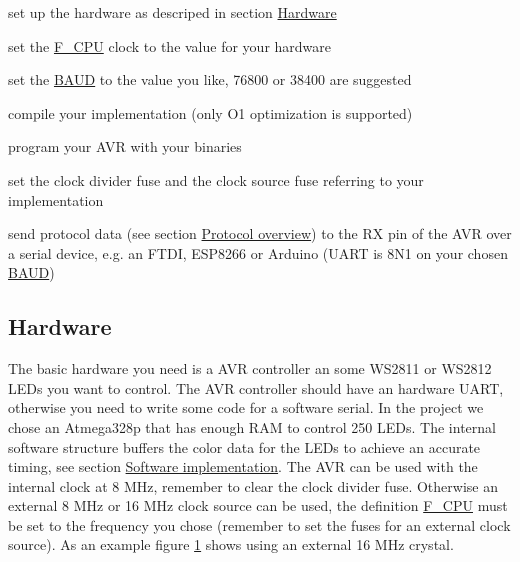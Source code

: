 \begin{DoxyItemize}
\item set up the hardware as descriped in section \hyperlink{index_hardware_sec}{Hardware} 
\item set the \hyperlink{globals_8h_a43bafb28b29491ec7f871319b5a3b2f8}{F\+\_\+\+C\+P\+U} clock to the value for your hardware 
\item set the \hyperlink{ws2811lichterkette_8c_a62634036639f88eece6fbf226b45f84b}{B\+A\+U\+D} to the value you like, 76800 or 38400 are suggested 
\item compile your implementation (only O1 optimization is supported) 
\item program your A\+V\+R with your binaries 
\item set the clock divider fuse and the clock source fuse referring to your implementation 
\item send protocol data (see section \hyperlink{index_protocol_sec}{Protocol overview}) to the R\+X pin of the A\+V\+R over a serial device, e.\+g. an F\+T\+D\+I, E\+S\+P8266 or Arduino (U\+A\+R\+T is 8\+N1 on your chosen \hyperlink{ws2811lichterkette_8c_a62634036639f88eece6fbf226b45f84b}{B\+A\+U\+D}) 
\end{DoxyItemize}\hypertarget{index_hardware_sec}{}\subsection{Hardware}\label{index_hardware_sec}
The basic hardware you need is a A\+V\+R controller an some W\+S2811 or W\+S2812 L\+E\+Ds you want to control. The A\+V\+R controller should have an hardware U\+A\+R\+T, otherwise you need to write some code for a software serial. In the project we chose an Atmega328p that has enough R\+A\+M to control 250 L\+E\+Ds. The internal software structure buffers the color data for the L\+E\+Ds to achieve an accurate timing, see section \hyperlink{index_software_sec}{Software implementation}. The A\+V\+R can be used with the internal clock at 8 M\+Hz, remember to clear the clock divider fuse. Otherwise an external 8 M\+Hz or 16 M\+Hz clock source can be used, the definition \hyperlink{globals_8h_a43bafb28b29491ec7f871319b5a3b2f8}{F\+\_\+\+C\+P\+U} must be set to the frequency you chose (remember to set the fuses for an external clock source). As an example figure \hyperlink{index_one}{1} shows using an external 16 M\+Hz crystal. \label{index_one}%
\hypertarget{index_one}{}%
  
